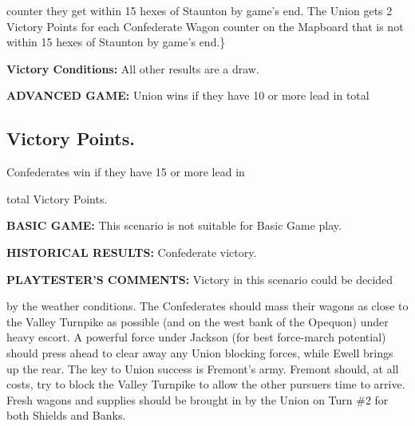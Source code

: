 counter they get within 15 hexes of Staunton by game's end. The Union gets 2 Victory Points for each Confederate Wagon counter on the Mapboard that is not within 15 hexes of Staunton by game's end.\}

\begin{scenariodata}
\textbf{Victory Conditions:} All other results are a draw.\\
\end{scenariodata}

\begin{scenariodata}
\textbf{ADVANCED GAME:} Union wins if they have 10 or more lead in total\\
\end{scenariodata}

\subsection*{Victory Points.}

\begin{scenariodata}
Confederates win if they have 15 or more lead in\\
\end{scenariodata}

total Victory Points.

\begin{scenariodata}
\textbf{BASIC GAME:} This scenario is not suitable for Basic Game play.\\
\end{scenariodata}

\begin{scenariodata}
\textbf{HISTORICAL RESULTS:} Confederate victory.\\
\end{scenariodata}

\begin{scenariodata}
\textbf{PLAYTESTER'S COMMENTS:} Victory in this scenario could be decided\\
\end{scenariodata}

by the weather conditions. The Confederates should mass their wagons as close to the Valley Turnpike as possible (and on the west bank of the Opequon) under heavy escort. A powerful force under Jackson (for best force-march potential) should press ahead to clear away any Union blocking forces, while Ewell brings up the rear. The key to Union success is Fremont's army. Fremont should, at all costs, try to block the Valley Turnpike to allow the other pursuers time to arrive. Fresh wagons and supplies should be brought in by the Union on Turn \#2 for both Shields and Banks.

